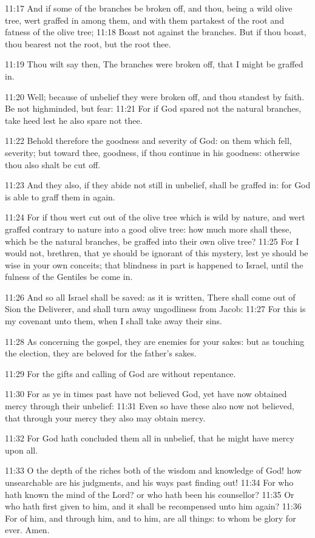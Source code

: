 11:17 And if some of the branches be broken off, and thou, being a
wild olive tree, wert graffed in among them, and with them partakest
of the root and fatness of the olive tree; 11:18 Boast not against the
branches. But if thou boast, thou bearest not the root, but the root
thee.

11:19 Thou wilt say then, The branches were broken off, that I might
be graffed in.

11:20 Well; because of unbelief they were broken off, and thou
standest by faith. Be not highminded, but fear: 11:21 For if God
spared not the natural branches, take heed lest he also spare not
thee.

11:22 Behold therefore the goodness and severity of God: on them which
fell, severity; but toward thee, goodness, if thou continue in his
goodness: otherwise thou also shalt be cut off.

11:23 And they also, if they abide not still in unbelief, shall be
graffed in: for God is able to graff them in again.

11:24 For if thou wert cut out of the olive tree which is wild by
nature, and wert graffed contrary to nature into a good olive tree:
how much more shall these, which be the natural branches, be graffed
into their own olive tree?  11:25 For I would not, brethren, that ye
should be ignorant of this mystery, lest ye should be wise in your own
conceits; that blindness in part is happened to Israel, until the
fulness of the Gentiles be come in.

11:26 And so all Israel shall be saved: as it is written, There shall
come out of Sion the Deliverer, and shall turn away ungodliness from
Jacob: 11:27 For this is my covenant unto them, when I shall take away
their sins.

11:28 As concerning the gospel, they are enemies for your sakes: but
as touching the election, they are beloved for the father's sakes.

11:29 For the gifts and calling of God are without repentance.

11:30 For as ye in times past have not believed God, yet have now
obtained mercy through their unbelief: 11:31 Even so have these also
now not believed, that through your mercy they also may obtain mercy.

11:32 For God hath concluded them all in unbelief, that he might have
mercy upon all.

11:33 O the depth of the riches both of the wisdom and knowledge of
God!  how unsearchable are his judgments, and his ways past finding
out!  11:34 For who hath known the mind of the Lord? or who hath been
his counsellor?  11:35 Or who hath first given to him, and it shall be
recompensed unto him again?  11:36 For of him, and through him, and to
him, are all things: to whom be glory for ever. Amen.

